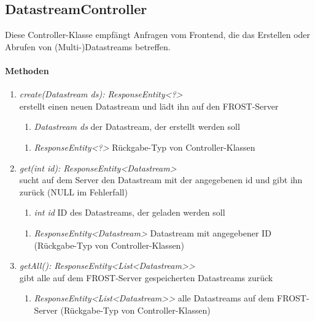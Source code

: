 \subsection*{DatastreamController}\label{dataCon}
Diese Controller-Klasse empfängt Anfragen vom Frontend, die das Erstellen oder Abrufen von (Multi-)Datastreams betreffen.


\paragraph{Methoden}

\begin{enumerate}[+]
	\item \textit{ create(Datastream ds): ResponseEntity<?> }\\
	erstellt einen neuen Datastream und lädt ihn auf den FROST-Server
	
	\begin{enumerate}[$\bullet$]
		\item \textit{Datastream ds} der Datastream, der erstellt werden soll
		
	\end{enumerate}
	\vspace{-0.2cm}
	\begin{enumerate}[$\circ$]
		\item \textit{ResponseEntity<?>} Rückgabe-Typ von Controller-Klassen
	\end{enumerate}
	
	\item \textit{ get(int id): ResponseEntity<Datastream> }\\
	sucht auf dem Server den Datastream mit der angegebenen id und gibt ihn zurück (NULL im Fehlerfall)
	
	\begin{enumerate}[$\bullet$]
		\item \textit{int id} ID des Datastreams, der geladen werden soll
		
	\end{enumerate}
	\vspace{-0.2cm}
	\begin{enumerate}[$\circ$]
		\item \textit{ResponseEntity<Datastream>} Datastream mit angegebener ID (Rückgabe-Typ von Controller-Klassen)
	\end{enumerate}
	\item \textit{ getAll(): ResponseEntity<List<Datastream>> }\\
	gibt alle auf dem FROST-Server gespeicherten Datastreams zurück
	
	\begin{enumerate}[$\circ$]
		\item \textit{ResponseEntity<List<Datastream>>} alle Datastreams auf dem FROST-Server (Rückgabe-Typ von Controller-Klassen)
	\end{enumerate}
	
	
\end{enumerate}	